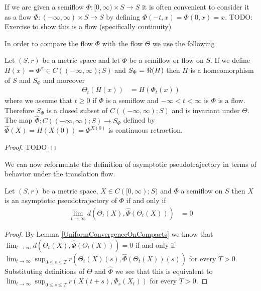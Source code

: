 If we are given a semiflow $\Phi : [0,\infty) \times S \to S$ it is often convenient to consider it as a flow $\Phi : (-\infty,\infty) \times S \to S$ by defining $\Phi(-t,x) = \Phi(0,x) = x$.  TODO: Exercise to show this is a flow (specifically continuity)

In order to compare the flow $\Phi$ with the flow $\Theta$ we use the following
\begin{prop}Let $(S,r)$ be a metric space and let $\Phi$ be a semiflow or flow on $S$.  If we define $H(x) = \Phi^x \in C((-\infty, \infty); S)$ and $S_\Phi = \Re(H)$ then $H$ is a homeomorphism of $S$ and $S_\Phi$ and moreover
\begin{align*}
\Theta_t (H(x)) &= H(\Phi_t(x))
\end{align*}
where we assume that $t \geq 0$ if $\Phi$ is a semiflow and $-\infty < t < \infty$ is $\Phi$ is a flow.  Therefore $S_\Phi$ is a closed subset of $C((-\infty, \infty); S)$ and is invariant under $\Theta$.  The map $\hat{\Phi} : C((-\infty, \infty);S) \to S_\Phi$ defined by $\hat{\Phi}(X) = H(X(0)) = \Phi^{X(0)}$ is continuous retraction.
\end{prop}
\begin{proof}
TODO
\end{proof}

We can now reformulate the definition of asymptotic pseudotrajectory in terms of behavior under the translation flow.
\begin{lem}Let $(S,r)$ be a metric space, $X \in C([0,\infty); S)$ and $\Phi$ a semiflow on $S$ then $X$ is an asymptotic pseudotrajectory of $\Phi$ if and only if
\begin{align*}
\lim_{t \to \infty} d(\Theta_t(X), \hat{\Phi}(\Theta_t(X))) &= 0
\end{align*}
\end{lem}
\begin{proof}
By Lemma \ref{UniformConvergenceOnCompacts} we know that $\lim_{t \to \infty} d(\Theta_t(X), \hat{\Phi}(\Theta_t(X))) = 0$ if and only if $\lim_{t \to \infty} \sup_{0 \leq s \leq T} r(\Theta_t(X)(s), \hat{\Phi}(\Theta_t(X))(s)) $ for every $T>0$.  Substituting definitions of $\Theta$ and $\hat{\Phi}$ we see that this is equivalent to
$\lim_{t \to \infty} \sup_{0 \leq s \leq T} r(X(t+s), \Phi_s(X_t)) $ for every $T>0$.  
\end{proof}

